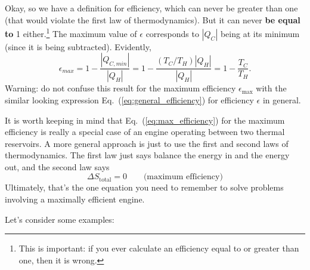 Okay, so we have a definition for efficiency, which can never be
greater than one (that would violate the first law of thermodynamics).
But it can never {\bf be equal to} 1 either.\footnote{This is
  important: if you ever calculate an efficiency equal to or greater
  than one, then it is wrong.}  The maximum value of $\epsilon$
corresponds to $|Q_C|$ being at its minimum (since it is being subtracted).
Evidently,
\begin{equation}
\epsilon_{max} = 1 - \frac{|Q_{C,min}|}{|Q_H|} = 1 -
\frac{(T_C/T_H)|Q_H|}{|Q_H|} = 1-\frac{T_C}{T_H}.
\label{eq:max_efficiency}
\end{equation}
Warning: do not confuse this result for the maximum efficiency
$\epsilon_\text{max}$ with the similar looking expression
Eq.~(\ref{eq:general_efficiency}) for efficiency $\epsilon$ in general.

It is worth keeping in mind that Eq.~(\ref{eq:max_efficiency}) for the
maximum efficiency is really a special case of an engine operating
between two thermal reservoirs.  A more general approach is just to
use the first and second laws of thermodynamics.  The first law just says
balance the energy in and the energy out, and the second law says
%
\begin{equation}
\Delta S_\text{total} = 0 \qquad\text{(maximum efficiency)}
\end{equation}
Ultimately, that's the one equation you need to remember
to solve problems involving a maximally efficient engine.

Let's consider some examples:

